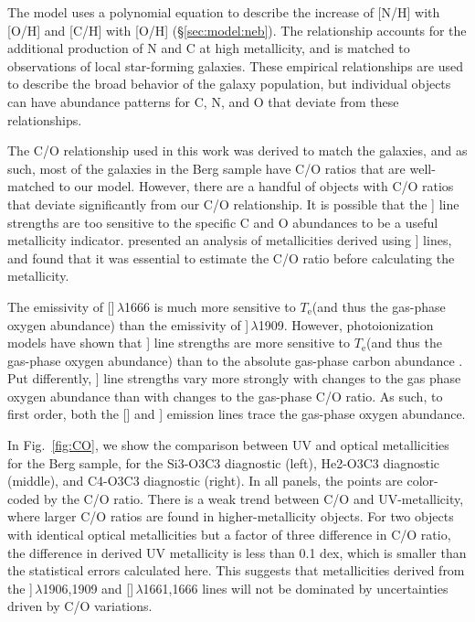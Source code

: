 \documentclass[preprint2]{aastex62}
\newcommand{\oiii}{[\ion{O}{3}]}
\newcommand{\ciii}{\ion{C}{3}]}
\newcommand{\Te}{\ensuremath{T_{\mathrm{e}}}\xspace}
\begin{document}
The  model uses a polynomial equation to describe the increase of [N/H] with [O/H] and [C/H] with [O/H] (\S\ref{sec:model:neb}). The relationship accounts for the additional production of N and C at high metallicity, and is matched to observations of local star-forming galaxies. These empirical relationships are used to describe the broad behavior of the galaxy population, but individual objects can have abundance patterns for C, N, and O that deviate from these relationships.

The C/O relationship used in this work was derived to match the \citet{Berg+2016} galaxies, and as such, most of the galaxies in the Berg sample have C/O ratios that are well-matched to our model. However, there are a handful of objects with C/O ratios that deviate significantly from our C/O relationship. It is possible that the \ciii{} line strengths are too sensitive to the specific C and O abundances to be a useful metallicity indicator. \citet{PerezMontero+2017} presented an analysis of metallicities derived using \ciii{} lines, and found that it was essential to estimate the C/O ratio before calculating the metallicity. 

The emissivity of \oiii$\,\lambda$1666 is much more sensitive to \Te (and thus the gas-phase oxygen abundance) than the emissivity of \ciii$\,\lambda$1909. However, photoionization models have shown that \ciii{} line strengths are more sensitive to \Te (and thus the gas-phase oxygen abundance) than to the absolute gas-phase carbon abundance \citep{Jaskot+2016, Byler+2018}. Put differently, \ciii{} line strengths vary more strongly with changes to the gas phase oxygen abundance than with changes to the gas-phase C/O ratio. As such, to first order, both the \oiii{} and \ciii{} emission lines trace the gas-phase oxygen abundance.

In Fig.~\ref{fig:CO}, we show the comparison between UV and optical metallicities for the Berg sample, for the Si3-O3C3 diagnostic (left), He2-O3C3 diagnostic (middle), and C4-O3C3 diagnostic (right). In all panels, the points are color-coded by the C/O ratio. There is a weak trend between C/O and UV-metallicity, where larger C/O ratios are found in higher-metallicity objects. For two objects with identical optical metallicities but a factor of three difference in C/O ratio, the difference in derived UV metallicity is less than 0.1 dex, which is smaller than the statistical errors calculated here. This suggests that metallicities derived from the \ciii$\,\lambda$1906,1909 and \oiii$\,\lambda$1661,1666 lines will not be dominated by uncertainties driven by C/O variations.
\end{document}
